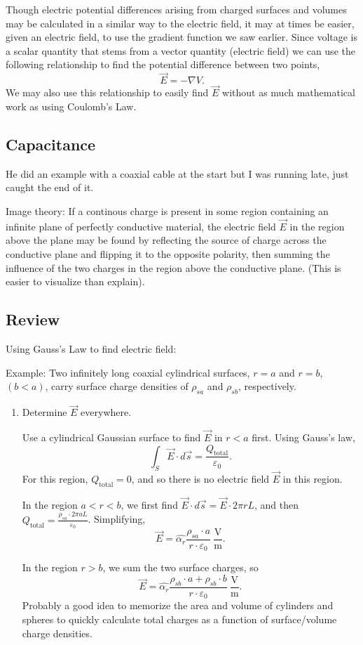 \documentclass{article}
\begin{document}
Though electric potential differences arising from charged surfaces and volumes may be calculated in a similar way to the electric field, it may at times be easier, given an electric field, to use the gradient function we saw earlier. Since voltage is a scalar quantity that stems from a vector quantity (electric field) we can use the following relationship to find the potential difference between two points, 
\[
  \vec{E} = - \nabla V.
\]
We may also use this relationship to easily find \(\vec{E}\) without as much mathematical work as using Coulomb's Law.

\setcounter{subsection}{8}
\subsection{Capacitance}

He did an example with a coaxial cable at the start but I was running late, just caught the end of it. 

Image theory: If a continous charge is present in some region containing an infinite plane of perfectly conductive material, the electric field \(\vec{E}\) in the region above the plane may be found by reflecting the source of charge across the conductive plane and flipping it to the opposite polarity, then summing the influence of the two charges in the region above the conductive plane. (This is easier to visualize than explain). 

\subsection{Review}

Using Gauss's Law to find electric field:

Example: Two infinitely long coaxial cylindrical surfaces, \(r = a\) and \(r=b\), \((b<a)\), carry surface charge densities of \(\rho_{sa}\) and \(\rho_{sb}\), respectively.

\begin{enumerate}[label=\alph*)]
	\item Determine \(\vec{E}\) everywhere.

	Use a cylindrical Gaussian surface to find \(\vec{E}\) in \(r<a\) first. Using Gauss's law, \[
		\int_{S}\vec{E}\cdot d \vec{s} = \frac{Q_{\mathrm{total}}}{\varepsilon_0}.
	\]
	For this region, \(Q_{\mathrm{total}} = 0\), and so there is no electric field \(\vec{E}\) in this region.

	In the region \(a < r < b\), we first find \(\vec{E} \cdot d \vec{s} = \vec{E} \cdot 2 \pi rL\), and then \(Q_{\mathrm{total}} = \frac{\rho_{sa} \cdot 2 \pi aL}{\varepsilon_0}\). Simplifying, \[
		\vec{E} = \hat{\alpha_r}\frac{\rho_{sa}\cdot a}{r \cdot \varepsilon_0} \ \mathrm{\frac{V}{m}}.
	\] 

	In the region \(r > b\), we sum the two surface charges, so \[
		\vec{E}=\hat{\alpha_r}\frac{\rho_{sb} \cdot a + \rho_{sb}\cdot b}{r\cdot \varepsilon_0} \ \mathrm{\frac{V}{m}}.
	\]
	Probably a good idea to memorize the area and volume of cylinders and spheres to quickly calculate total charges as a function of surface/volume charge densities.
\end{enumerate}
\end{document}
